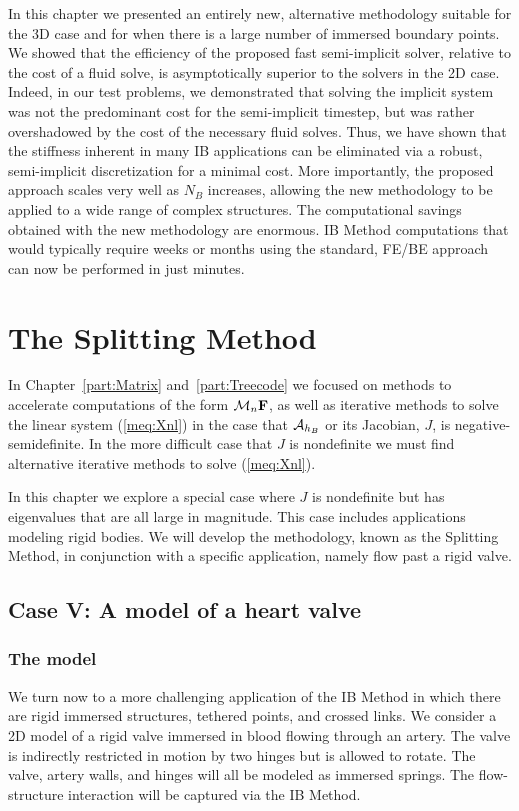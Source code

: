 In this chapter we presented an entirely new, alternative methodology suitable for the 3D case and for when there is a large number of immersed boundary points. We showed that the efficiency of the proposed  fast  semi-implicit solver,  relative to the cost of a fluid solve,  is asymptotically superior to the solvers in the 2D case. Indeed, in our test problems, we demonstrated that solving the implicit system was not the predominant cost for the semi-implicit timestep, but was rather overshadowed by the cost of the necessary fluid solves. Thus, we have  shown that the stiffness inherent in many IB applications can be eliminated via a  robust, semi-implicit discretization  for a minimal cost. More importantly, the proposed approach scales very well as $N_B$ increases, allowing the new methodology to be applied to a wide range of complex structures.
The computational savings obtained with the new methodology are enormous. IB Method computations that would typically require weeks or months using the  standard, FE/BE approach can now be performed in just minutes.






\chapter{The Splitting Method}
\label{part:Splitting}
\noindent
In Chapter~\ref{part:Matrix} and~\ref{part:Treecode} we focused on methods to accelerate computations of the form $\mathcal{M}_n\mathbf{F}$, as well as iterative methods to solve the linear system (\ref{meq:Xnl}) in the case that $\mathcal{A}_{h_B}$ or its Jacobian, $J$, is negative-semidefinite. In the more difficult case that $J$ is nondefinite we must find alternative iterative methods to solve (\ref{meq:Xnl}).

In this chapter we explore a special case where $J$ is nondefinite but has eigenvalues that are all large in magnitude. This case includes applications modeling rigid bodies. We will develop the methodology, known as the Splitting Method, in conjunction with a specific application, namely flow past a rigid valve.

\section{Case V: A model of a heart valve}
\label{Sec:valve}
\subsection{The model}
We turn now to a more challenging application of the IB Method in which there are rigid immersed
structures, tethered points, and crossed links. 
We consider a 2D model of a rigid valve immersed in blood flowing through an artery. The valve is indirectly restricted in motion by two hinges but is allowed to rotate. The valve, artery walls, and hinges will all be modeled as immersed springs. The flow-structure interaction will be captured 
via the IB Method.


